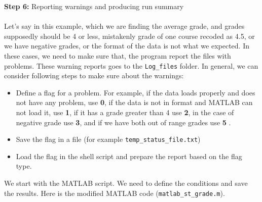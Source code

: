 \textbf{Step 6:} Reporting warnings and producing run summary\\ \\
\noindent
Let's say in this example, which we are finding the average grade, and grades supposedly should be 4 or less, mistakenly grade of one course recoded as 4.5, or we have negative grades, or the format of the data is not what we expected. In these cases, we need to make sure that, the program report the files with problems. These warning reports goes to the \texttt{Log\_files} folder. In general, we can consider following steps to make sure about the warnings:\\

\begin{itemize}

\item{Define a flag for a problem. For example, if the data loads properly and does not have any problem, use \textbf{0}, if the data is not in format and MATLAB can not load it, use \textbf{1}, if it has a grade greater than 4 use \textbf{2}, in the case of negative grade use \textbf{3}, and if we have both out of range grades use \textbf{5} }.
\item{Save the flag in a file (for example \texttt{temp\_status\_file.txt})}
\item{Load the flag in the shell script and prepare the report based on the flag type.}

\end{itemize}

\noindent
We start with the MATLAB script. We need to define the conditions and save the results. Here is the modified MATLAB code (\texttt{matlab\_st\_grade.m}).\\
\\

